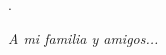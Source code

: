 \tiny{.}

\vspace{10cm}

\normalsize{}

\begin{flushright}
	\textit{A mi familia y amigos...}
\end{flushright}


